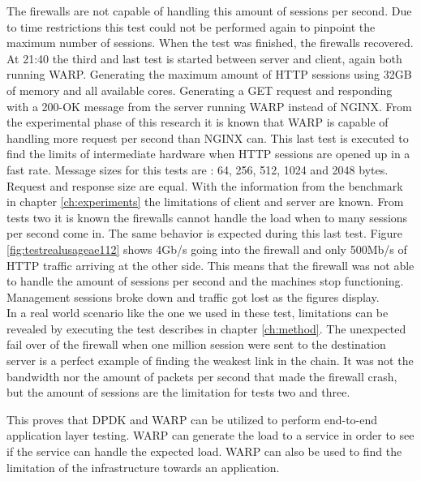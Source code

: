 The firewalls are not capable of handling this amount of sessions per second. Due to time restrictions this test could not be performed again to pinpoint the maximum number of sessions.  
When the test was finished, the firewalls recovered. \\ 

At 21:40 the third and last test is started between server and client, again both running WARP. 
Generating the maximum amount of HTTP sessions using 32GB of memory and all available cores.
Generating a GET request and responding with a 200-OK message from the server running WARP instead of NGINX.  
From the experimental phase of this research it is known that WARP is capable of handling more request per second than NGINX can. This last test is executed to find the limits of intermediate hardware when HTTP sessions are opened up in a fast rate.
Message sizes for this tests are : 64, 256, 512, 1024 and 2048 bytes. Request and response size are equal. 
With the information from the benchmark in chapter \ref{ch:experiments} the limitations of client and server are known. 
From tests two it is known the firewalls cannot handle the load  when to many sessions per second come in. The same behavior is expected during this last test.
Figure \ref{fig:testrealusageae112} shows 4Gb/s going into the firewall and only 500Mb/s of HTTP traffic arriving at the other side.
This means that the firewall was not able to handle the amount of sessions per second and the machines stop functioning. 
Management sessions broke down and traffic got lost as the figures display. \\

In a real world scenario like the one we used in these test, limitations can be revealed by executing the test describes in chapter \ref{ch:method}. 
The unexpected fail over of the firewall when one million session were sent to the destination server is a perfect example of finding the weakest link in the chain.
It was not the bandwidth nor the amount of packets per second that made the firewall crash, but the amount of sessions are the limitation for tests two and three. 

This proves that DPDK and WARP can be utilized to perform end-to-end application layer testing. 
WARP can generate the load to a service in order to see if the service can handle the expected load. WARP can also be used to find the limitation of the infrastructure towards an application.

